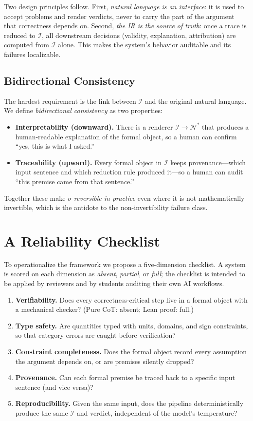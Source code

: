 \documentclass[11pt]{article}
\newcommand{\IR}{\mathcal{I}}
\newcommand{\NL}{\mathcal{N}}
\begin{document}
Two design principles follow. First, \emph{natural language is an interface}: it is used to accept problems and render verdicts, never to carry the part of the argument that correctness depends on. Second, \emph{the IR is the source of truth}: once a trace is reduced to $\IR$, all downstream decisions (validity, explanation, attribution) are computed from $\IR$ alone. This makes the system's behavior auditable and its failures localizable.

\subsection{Bidirectional Consistency}
The hardest requirement is the link between $\IR$ and the original natural language. We define \emph{bidirectional consistency} as two properties:
\begin{itemize}
\item \textbf{Interpretability (downward).} There is a renderer $\IR \to \NL^*$ that produces a human-readable explanation of the formal object, so a human can confirm ``yes, this is what I asked.''
\item \textbf{Traceability (upward).} Every formal object in $\IR$ keeps provenance---which input sentence and which reduction rule produced it---so a human can audit ``this premise came from that sentence.''
\end{itemize}
Together these make $\sigma$ \emph{reversible in practice} even where it is not mathematically invertible, which is the antidote to the non-invertibility failure class.

\section{A Reliability Checklist}
To operationalize the framework we propose a five-dimension checklist. A system is scored on each dimension as \emph{absent}, \emph{partial}, or \emph{full}; the checklist is intended to be applied by reviewers and by students auditing their own AI workflows.

\begin{enumerate}
\item \textbf{Verifiability.} Does every correctness-critical step live in a formal object with a mechanical checker? (Pure CoT: absent; Lean proof: full.)
\item \textbf{Type safety.} Are quantities typed with units, domains, and sign constraints, so that category errors are caught before verification?
\item \textbf{Constraint completeness.} Does the formal object record every assumption the argument depends on, or are premises silently dropped?
\item \textbf{Provenance.} Can each formal premise be traced back to a specific input sentence (and vice versa)?
\item \textbf{Reproducibility.} Given the same input, does the pipeline deterministically produce the same $\IR$ and verdict, independent of the model's temperature?
\end{enumerate}
\end{document}
